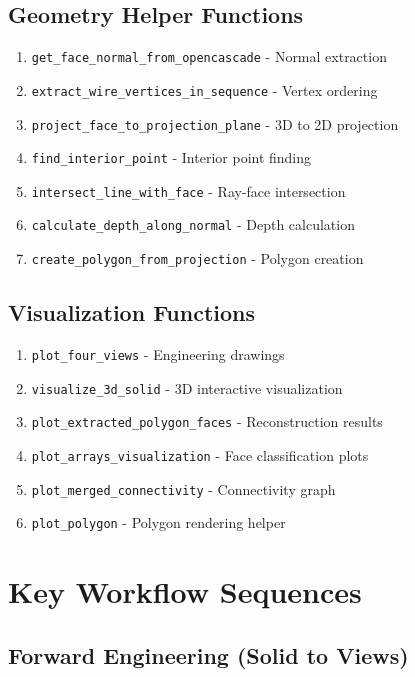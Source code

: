 \documentclass[11pt,a4paper]{article}
\begin{document}
\subsection{Geometry Helper Functions}
\begin{enumerate}
    \item \texttt{get\_face\_normal\_from\_opencascade} - Normal extraction
    \item \texttt{extract\_wire\_vertices\_in\_sequence} - Vertex ordering
    \item \texttt{project\_face\_to\_projection\_plane} - 3D to 2D projection
    \item \texttt{find\_interior\_point} - Interior point finding
    \item \texttt{intersect\_line\_with\_face} - Ray-face intersection
    \item \texttt{calculate\_depth\_along\_normal} - Depth calculation
    \item \texttt{create\_polygon\_from\_projection} - Polygon creation
\end{enumerate}

\subsection{Visualization Functions}
\begin{enumerate}
    \item \texttt{plot\_four\_views} - Engineering drawings
    \item \texttt{visualize\_3d\_solid} - 3D interactive visualization
    \item \texttt{plot\_extracted\_polygon\_faces} - Reconstruction results
    \item \texttt{plot\_arrays\_visualization} - Face classification plots
    \item \texttt{plot\_merged\_connectivity} - Connectivity graph
    \item \texttt{plot\_polygon} - Polygon rendering helper
\end{enumerate}

\newpage
\section{Key Workflow Sequences}

\subsection{Forward Engineering (Solid to Views)}
\end{document}
